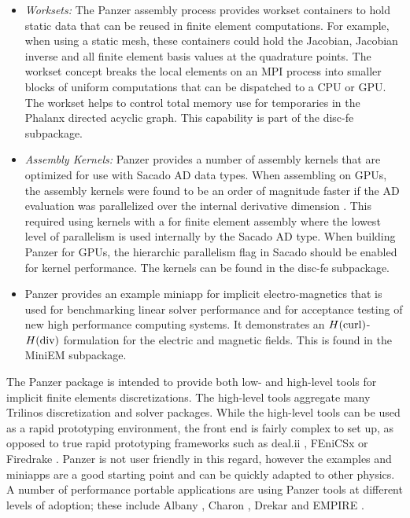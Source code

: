 \begin{itemize}
\item \emph{Worksets:} The Panzer assembly process provides workset containers to hold static data that can be reused in finite element computations. For example, when using a static mesh, these containers could hold the Jacobian, Jacobian inverse and all finite element basis values at the quadrature points. The workset concept breaks the local elements on an MPI process into smaller blocks of uniform computations that can be dispatched to a CPU or GPU. The workset helps to control total memory use for temporaries in the Phalanx directed acyclic graph. This capability is part of the disc-fe subpackage.
\item \emph{Assembly Kernels:} Panzer provides a number of assembly kernels that are optimized for use with Sacado AD data types. When assembling on GPUs, the assembly kernels were found to be an order of magnitude faster if the AD evaluation was parallelized over the internal derivative dimension \cite{phipps2022automatic}. This required using kernels with a  for finite element assembly where the lowest level of parallelism is used internally by the Sacado AD type. When building Panzer for GPUs, the  hierarchic parallelism flag in Sacado should be enabled for kernel performance. The kernels can be found in the disc-fe subpackage. 
\item Panzer provides an example miniapp for implicit electro-magnetics that is used for benchmarking linear solver performance and for acceptance testing of new high performance computing systems. It demonstrates an $H(\rm{curl})$-$H(\rm{div})$ formulation for the electric and magnetic fields. This is found in the MiniEM subpackage.
\end{itemize}

The Panzer package is intended to provide both low- and high-level tools for implicit finite elements discretizations. The high-level tools aggregate many Trilinos discretization and solver packages. While the high-level tools can be used as a rapid prototyping environment, the front end is fairly complex to set up, as opposed to true rapid prototyping frameworks such as deal.ii \cite{dealII95}, FEniCSx \cite{BarattaEtal2023} or Firedrake \cite{FiredrakeUserManual}. Panzer is not user friendly in this regard, however the examples and miniapps are a good starting point and can be quickly adapted to other physics. A number of performance portable applications are using Panzer tools at different levels of adoption; these include Albany \cite{Salinger2016}, Charon \cite{CharonUsersManual2020}, Drekar \cite{Crockatt2022,Miller2019,Shadid2016mhd} and EMPIRE \cite{BettencourtBrownEtAl2021_EmpirePic}.

